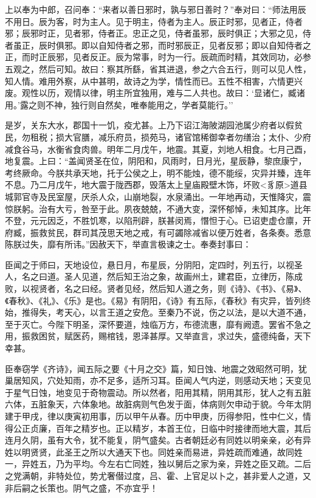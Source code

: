 \documentclass[]{article}
\begin{document}
上以奉为中郎，召问奉：``来者以善日邪时，孰与邪日善时？''奉对曰：``师法用辰不用日。辰为客，时为主人。见于明主，侍者为主人。辰正时邪，见者正，侍者邪；辰邪时正，见者邪，侍者正。忠正之见，侍者虽邪，辰时俱正；大邪之见，侍者虽正，辰时俱邪。即以自知侍者之邪，而时邪辰正，见者反邪；即以自知侍者之正，而时正辰邪，见者反正。辰为常事，时为一行。辰疏而时精，其效同功，必参五观之，然后可知。故曰：察其所繇，省其进退，参之六合五行，则可以见人性，知人情。难用外察，从中甚明，故诗之为学，情性而已。五性不相害，六情更兴废。观性以历，观情以律，明主所宜独用，难与二人共也。故曰：`显诸仁，臧诸用。'露之则不神，独行则自然矣，唯奉能用之，学者莫能行。''

是岁，关东大水，郡国十一饥，疫尤甚。上乃下诏江海陂湖园池属少府者以假贫民，勿租税；损大官膳，减乐府员，损苑马，诸官馆稀御幸者勿缮治；太仆、少府减食谷马，水衡省食肉兽。明年二月戊午，地震。其夏，刘地人相食。七月己酉，地复震。上曰：``盖闻贤圣在位，阴阳和，风雨时，日月光，星辰静，黎庶康宁，考终厥命。今朕共承天地，托于公侯之上，明不能烛，德不能绥，灾异并臻，连年不息。乃二月戊午，地大震于陇西郡，毁落太上皇庙殿壁木饰，坏败\textless{}豸原\textgreater{}道县城郭官寺及民室屋，厌杀人众，山崩地裂，水泉涌出。一年地再动，天惟降灾，震惊朕躬。治有大亏，咎至于此。夙夜兢兢，不通大变，深怀郁悼，未知其序。比年不登，元元因乏，不胜饥寒，以陷刑辟，朕甚闵焉，憯怛于心。已诏吏虚仓廪，开府臧，振救贫民，群司其茂思天地之戒，有可蠲除减省以便万姓者，各条奏。悉意陈朕过失，靡有所讳。''因赦天下，举直言极谏之士。奉奏封事曰：

臣闻之于师曰，天地设位，悬日月，布星辰，分阴阳，定四时，列五行，以视圣人，名之曰道。圣人见道，然后知王治之象，故画州土，建君臣，立律历，陈成败，以视贤者，名之曰经。贤者见经，然后知人道之务，则《诗》、《书》、《易》、《春秋》、《礼》、《乐》是也。《易》有阴阳，《诗》有五际，《春秋》有灾异，皆列终始，推得失，考天心，以言王道之安危。至秦乃不说，伤之以法，是以大道不通，至于灭亡。今陛下明圣，深怀要道，烛临万方，布德流惠，靡有阙遗。罢省不急之用，振救困贫，赋医药，赐棺钱，恩泽甚厚。又举直言，求过失，盛德纯备，天下幸甚。

臣奉窃学《齐诗》，闻五际之要《十月之交》篇，知日蚀、地震之效昭然可明，犹巢居知风，穴处知雨，亦不足多，适所习耳。臣闻人气内逆，则感动天地；天变见于星气日蚀，地变见于奇物震动。所以然者，阳用其精，阴用其形，犹人之有五脏六体，五脏象天，六体象地。故脏病则气色发于面，体病则欠申动于貌。今年太阴建于甲戌，律以庚寅初用事，历以甲午从春。历中甲庚，历得参阳，性中仁义，情得公正贞廉，百年之精岁也。正以精岁，本首王位，日临中时接律而地大震，其后连月久阴，虽有大令，犹不能复，阴气盛矣。古者朝廷必有同姓以明亲亲，必有异姓以明贤贤，此圣王之所以大通天下也。同姓亲而易进，异姓疏而难通，故同姓一，异姓五，乃为平均。今左右亡同姓，独以舅后之家为亲，异姓之臣又疏。二后之党满朝，非特处位，势尤奢僣过度，吕、霍、上官足以卜之，甚非爱人之道，又非后嗣之长策也。阴气之盛，不亦宜乎！
\end{document}
